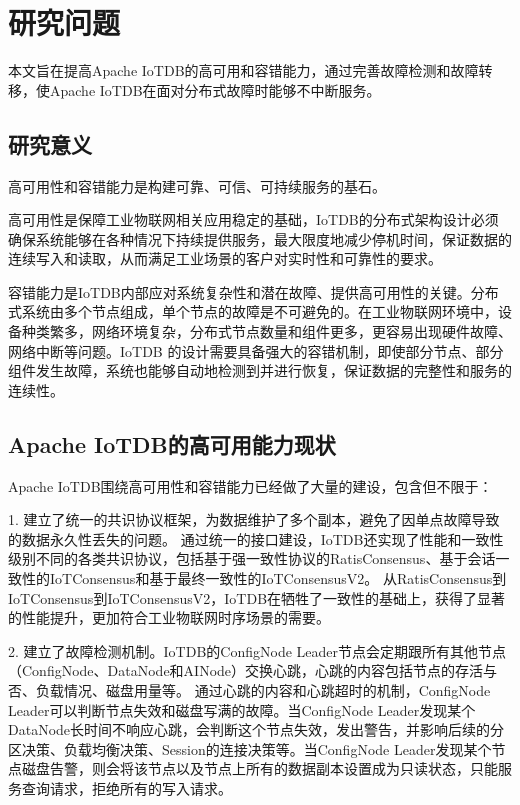 \section{研究问题}\label{1-motivation}

本文旨在提高Apache IoTDB的高可用和容错能力，通过完善故障检测和故障转移，使Apache IoTDB在面对分布式故障时能够不中断服务。

\subsection{研究意义}
高可用性和容错能力是构建可靠、可信、可持续服务的基石。

高可用性是保障工业物联网相关应用稳定的基础，IoTDB的分布式架构设计必须确保系统能够在各种情况下持续提供服务，最大限度地减少停机时间，保证数据的连续写入和读取，从而满足工业场景的客户对实时性和可靠性的要求。

容错能力是IoTDB内部应对系统复杂性和潜在故障、提供高可用性的关键。分布式系统由多个节点组成，单个节点的故障是不可避免的。在工业物联网环境中，设备种类繁多，网络环境复杂，分布式节点数量和组件更多，更容易出现硬件故障、网络中断等问题。IoTDB 的设计需要具备强大的容错机制，即使部分节点、部分组件发生故障，系统也能够自动地检测到并进行恢复，保证数据的完整性和服务的连续性。


\subsection{Apache IoTDB的高可用能力现状}

Apache IoTDB围绕高可用性和容错能力已经做了大量的建设，包含但不限于：

1. 建立了统一的共识协议框架，为数据维护了多个副本，避免了因单点故障导致的数据永久性丢失的问题。
通过统一的接口建设，IoTDB还实现了性能和一致性级别不同的各类共识协议，包括基于强一致性协议的RatisConsensus、基于会话一致性的IoTConsensus和基于最终一致性的IoTConsensusV2。
从RatisConsensus到IoTConsensus到IoTConsensusV2，IoTDB在牺牲了一致性的基础上，获得了显著的性能提升，更加符合工业物联网时序场景的需要。


2. 建立了故障检测机制。IoTDB的ConfigNode Leader节点会定期跟所有其他节点（ConfigNode、DataNode和AINode）交换心跳，心跳的内容包括节点的存活与否、负载情况、磁盘用量等。
通过心跳的内容和心跳超时的机制，ConfigNode Leader可以判断节点失效和磁盘写满的故障。当ConfigNode Leader发现某个DataNode长时间不响应心跳，会判断这个节点失效，发出警告，并影响后续的分区决策、负载均衡决策、Session的连接决策等。当ConfigNode Leader发现某个节点磁盘告警，则会将该节点以及节点上所有的数据副本设置成为只读状态，只能服务查询请求，拒绝所有的写入请求。

